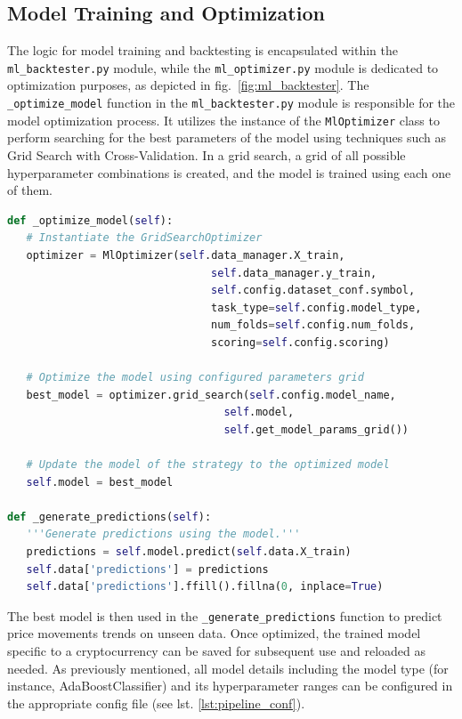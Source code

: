 \subsection{Model Training and Optimization}
The logic for model training and backtesting is encapsulated within the \texttt{ml\_backtester.py} module,
while the \texttt{ml\_optimizer.py} module is dedicated to optimization purposes, as depicted in fig.~\ref{fig:ml_backtester}.
The \texttt{\_optimize\_model} function in the \texttt{ml\_backtester.py} module is responsible for the model optimization process.
It utilizes the instance of the  \texttt{MlOptimizer} class to perform searching for the best parameters of the model using techniques such as Grid Search with Cross-Validation.
In a grid search, a grid of all possible hyperparameter combinations is created, and the model is trained using each one of them.
\noindent\begin{minipage}{\linewidth}
\begin{lstlisting}[style=pythonstyle, language=Python, caption={Functions of MlBacktester class for model optimization and predictions.},  captionpos=b, label=lst:add_features_function]
def _optimize_model(self):
   # Instantiate the GridSearchOptimizer
   optimizer = MlOptimizer(self.data_manager.X_train,
                                self.data_manager.y_train,
                                self.config.dataset_conf.symbol,
                                task_type=self.config.model_type,
                                num_folds=self.config.num_folds,
                                scoring=self.config.scoring)

   # Optimize the model using configured parameters grid
   best_model = optimizer.grid_search(self.config.model_name,
                                  self.model,
                                  self.get_model_params_grid())

   # Update the model of the strategy to the optimized model
   self.model = best_model

def _generate_predictions(self):
   '''Generate predictions using the model.'''
   predictions = self.model.predict(self.data.X_train)
   self.data['predictions'] = predictions
   self.data['predictions'].ffill().fillna(0, inplace=True)

\end{lstlisting}
\end{minipage}

The best model is then used in the \texttt{\_generate\_predictions} function to predict price movements trends on unseen data.
Once optimized, the trained model specific to a cryptocurrency can be saved for subsequent use and reloaded as needed.
As previously mentioned, all model details including the model type (for instance, AdaBoostClassifier) and its hyperparameter ranges can be configured in the appropriate config file (see lst. \ref{lst:pipeline_conf}).

